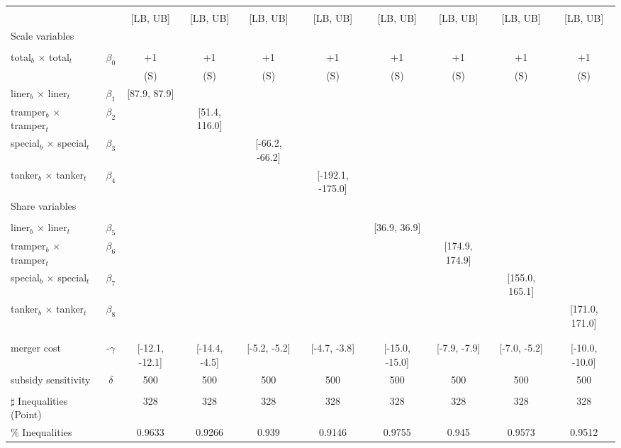 \begin{tabular}{@{\extracolsep{5pt}}lccccccccc}
\toprule 
 &  &  &  &  &  &  &  &  &  \\
 &  & [LB, UB] & [LB, UB] & [LB, UB] & [LB, UB] & [LB, UB] & [LB, UB] & [LB, UB] & [LB, UB] \\
\midrule 
Scale variables &  &  &  &  &  &  &  \\
 &  &  &  &  &  &  &  &  \\
total$_{b}$ $\times$ total$_{t}$ & $\beta_0$ & +1 & +1 & +1 & +1 & +1 & +1 & +1 & +1 \\
 &  & (S) & (S) & (S) & (S) & (S) & (S) & (S) & (S) \\
liner$_{b}$ $\times$ liner$_{t}$ & $\beta_1$ & [87.9, 87.9] &  &  &  &  &  &  &  \\
tramper$_{b}$ $\times$ tramper$_{t}$ & $\beta_2$ &  & [51.4, 116.0] &  &  &  &  &  &  \\
special$_{b}$ $\times$ special$_{t}$ & $\beta_3$ &  &  & [-66.2, -66.2] &  &  &  &  &  \\
tanker$_{b}$ $\times$ tanker$_{t}$ & $\beta_4$ &  &  &  & [-192.1, -175.0] &  &  &  &  \\
Share variables &  &  &  &  &  &  &  &  &  \\
 &  &  &  &  &  &  &  &  &  \\
liner$_{b}$ $\times$ liner$_{t}$ & $\beta_5$ &  &  &  &  & [36.9, 36.9] &  &  &  \\
tramper$_{b}$ $\times$ tramper$_{t}$ & $\beta_6$ &  &  &  &  &  & [174.9, 174.9] &  &  \\
special$_{b}$ $\times$ special$_{t}$ & $\beta_7$ &  &  &  &  &  &  & [155.0, 165.1] &  \\
tanker$_{b}$ $\times$ tanker$_{t}$ & $\beta_8$ &  &  &  &  &  &  &  & [171.0, 171.0] \\
 &  &  &  &  &  &  &  &  &  \\
 &  &  &  &  &  &  &  &  &  \\
merger cost & -$\gamma$ & [-12.1, -12.1] & [-14.4, -4.5] & [-5.2, -5.2] & [-4.7, -3.8] & [-15.0, -15.0] & [-7.9, -7.9] & [-7.0, -5.2] & [-10.0, -10.0] \\
subsidy sensitivity & $\delta$ & 500 & 500 & 500 & 500 & 500 & 500 & 500 & 500 \\
 &  &  &  &  &  &  &  &  &  \\
\hline 
$\sharp$ Inequalities (Point) &  & 328 & 328 & 328 & 328 & 328 & 328 & 328 & 328 \\
\% Inequalities &  & 0.9633 & 0.9266 & 0.939 & 0.9146 & 0.9755 & 0.945 & 0.9573 & 0.9512 \\
\bottomrule 
\end{tabular}
